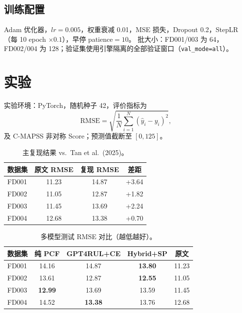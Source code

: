 \documentclass[UTF8,a4paper,10pt,twocolumn]{ctexart}
\begin{document}
\subsection{训练配置}

Adam 优化器，$lr{=}0.005$，权重衰减 0.01，MSE 损失，Dropout 0.2，StepLR（每 10 epoch $\times 0.1$），早停 patience${=}10$。
批大小：FD001/003 为 64，FD002/004 为 128；验证集使用引擎隔离的全部验证窗口（\texttt{val\_mode=all}）。

\section{实验}

实验环境：PyTorch，随机种子 42，评价指标为
\begin{equation}
  \mathrm{RMSE} = \sqrt{\frac{1}{N}\sum_{i=1}^{N}(\hat{y}_i - y_i)^2},
\end{equation}
及 C-MAPSS 非对称 Score；预测值截断至 $[0,125]$。

\begin{table}[t]
  \centering
  \caption{主复现结果 vs.\ Tan et al.\ (2025)。}
  \label{tab:main}
  \small
  \begin{tabular}{@{}lccc@{}}
    \toprule
    数据集 & 原文 RMSE & 复现 RMSE & 差距 \\
    \midrule
    FD001 & 11.23 & 14.87 & +3.64 \\
    FD002 & 11.05 & 12.87 & +1.82 \\
    FD003 & 11.45 & 13.69 & +2.24 \\
    FD004 & 12.68 & 13.38 & +0.70 \\
    \bottomrule
  \end{tabular}
\end{table}

\begin{table}[t]
  \centering
  \caption{多模型测试 RMSE 对比（越低越好）。}
  \label{tab:models}
  \scriptsize
  \begin{tabular}{@{}lcccc@{}}
    \toprule
    数据集 & 纯 PCF & GPT4RUL+CE & Hybrid+SP & 原文 \\
    \midrule
    FD001 & 14.16 & 14.87 & \textbf{13.80} & 11.23 \\
    FD002 & 13.61 & 12.87 & \textbf{12.55} & 11.05 \\
    FD003 & \textbf{12.99} & 13.69 & 13.59 & 11.45 \\
    FD004 & 14.52 & \textbf{13.38} & 13.76 & 12.68 \\
    \bottomrule
  \end{tabular}
\end{table}
\end{document}
